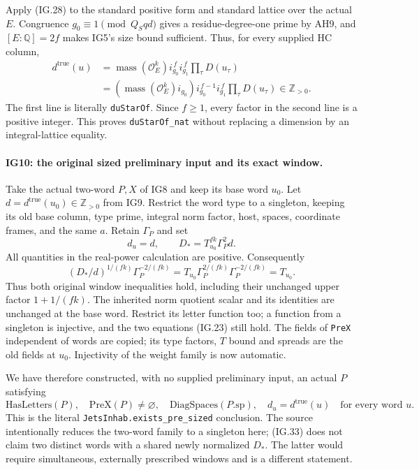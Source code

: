Apply (IG.28) to the standard positive form and standard lattice
over the actual $E$. Congruence $g_0\equiv1\pmod {Q_Sqd}$
gives a residue-degree-one prime by AH9, and
$[E:\mathbb Q]=2f$ makes IG5's size bound sufficient.
Thus, for every supplied HC column,
\[
 \begin{split}
 d^\mathrm{true}(u)
 &=\operatorname{mass}(\mathcal O_E^k)
                       i_{g_0}^{\,f}i_{g_1}^{\,f}
                        \prod_\tau D(u_\tau)\\
 &=(\operatorname{mass}(\mathcal O_E^k)i_{g_0})
                       i_{g_0}^{\,f-1}i_{g_1}^{\,f}
                        \prod_\tau D(u_\tau)
                         \in\mathbb Z_{>0}.           \tag{IG.30}
 \end{split}
\]
The first line is literally \texttt{duStarOf}. Since $f\ge1$,
every factor in the second line is a positive integer. This
proves \texttt{duStarOf\_nat} without replacing a dimension
by an integral-lattice equality.

\paragraph{IG10: the original sized preliminary input and its exact window.}
Take the actual two-word $P,X$ of IG8 and keep its base word
$u_0$. Let $d=d^\mathrm{true}(u_0)\in\mathbb Z_{>0}$ from
IG9. Restrict the word type to a singleton, keeping its old
base column, type prime, integral norm factor, host, spaces,
coordinate frames, and the same $a$. Retain $\Gamma_P$ and
set
\[
      d_u=d,\qquad D_* =T_{u_0}^{fk}\Gamma_P^2d.
                                                               \tag{IG.31}
\]
All quantities in the real-power calculation are positive.
Consequently
\[
 (D_*/d)^{1/(fk)}\Gamma_P^{-2/(fk)}
  =T_{u_0}\Gamma_P^{2/(fk)}\Gamma_P^{-2/(fk)}=T_{u_0}.
                                                               \tag{IG.32}
\]
Thus both original window inequalities hold, including their
unchanged upper factor $1+1/(fk)$. The inherited norm
quotient scalar and its identities are unchanged at the
base word. Restrict its letter function too; a function from
a singleton is injective, and the two equations (IG.23)
still hold. The fields of \texttt{PreX} independent of words
are copied; its type factors, $T$ bound and spreads are the
old fields at $u_0$. Injectivity of the weight family is now
automatic.

We have therefore constructed, with no supplied preliminary
input, an actual $P$ satisfying
\[
 \mathrm{HasLetters}(P),\quad
       \mathrm{PreX}(P)\ne\varnothing,\quad
       \mathrm{DiagSpaces}(P.\mathrm{sp}),\quad
       d_u=d^\mathrm{true}(u)\quad\text{for every word }u.
                                                               \tag{IG.33}
\]
This is the literal \texttt{JetsInhab.exists\_pre\_sized}
conclusion. The source intentionally reduces the two-word
family to a singleton here; (IG.33) does not claim two
distinct words with a shared newly normalized $D_*$.
The latter would require simultaneous, externally prescribed
windows and is a different statement.

